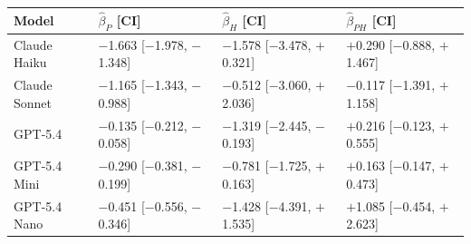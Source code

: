 \begin{tabular}{llll}
\toprule
\textbf{Model} & $\hat\beta_P$ \tiny{[CI]} & $\hat\beta_H$ \tiny{[CI]} & $\hat\beta_{PH}$ \tiny{[CI]} \\
\midrule
Claude Haiku & $-$1.663 \tiny{[$-$1.978, $-$1.348]} & $-$1.578 \tiny{[$-$3.478, $+$0.321]} & $+$0.290 \tiny{[$-$0.888, $+$1.467]} \\
Claude Sonnet & $-$1.165 \tiny{[$-$1.343, $-$0.988]} & $-$0.512 \tiny{[$-$3.060, $+$2.036]} & $-$0.117 \tiny{[$-$1.391, $+$1.158]} \\
GPT-5.4 & $-$0.135 \tiny{[$-$0.212, $-$0.058]} & $-$1.319 \tiny{[$-$2.445, $-$0.193]} & $+$0.216 \tiny{[$-$0.123, $+$0.555]} \\
GPT-5.4 Mini & $-$0.290 \tiny{[$-$0.381, $-$0.199]} & $-$0.781 \tiny{[$-$1.725, $+$0.163]} & $+$0.163 \tiny{[$-$0.147, $+$0.473]} \\
GPT-5.4 Nano & $-$0.451 \tiny{[$-$0.556, $-$0.346]} & $-$1.428 \tiny{[$-$4.391, $+$1.535]} & $+$1.085 \tiny{[$-$0.454, $+$2.623]} \\
\bottomrule
\end{tabular}